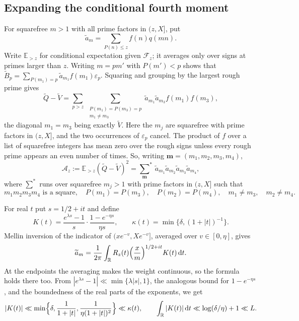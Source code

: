 \documentclass[11pt]{amsart}
\theoremstyle{remark}
\numberwithin{equation}{section}
\newcommand{\E}{\mathbb{E}}
\newcommand{\R}{\mathbb{R}}
\newcommand{\dd}{\,\mathrm{d}}
\newcommand{\tQ}{\widetilde{Q}}
\newcommand{\tV}{\widetilde{V}}
\newcommand{\tB}{\widetilde{B}}
\newcommand{\ta}{\widetilde{a}}
\newcommand{\bm}{\mathbf{m}}
\begin{document}
\subsection{Expanding the conditional fourth moment}
For squarefree $m>1$ with all prime factors in $(z,X]$, put
\[
\ta_m=\sum_{P(n)\le z}f(n)q(mn).
\]
Write $\E_{>z}$ for conditional expectation given $\mathcal F_z$; it averages only over signs at primes larger than $z$. Writing $m=pm'$ with $P(m')<p$ shows that $\tB_p=\sum_{P(m_1)=p}\ta_{m_1}f(m_1)\varepsilon_p$. Squaring and grouping by the largest rough prime gives
\[
\tQ-\tV=\sum_{p>z}\ \sum_{\substack{P(m_1)=P(m_3)=p\\ m_1\ne m_3}}\ta_{m_1}\ta_{m_3}f(m_1)f(m_3),
\]
the diagonal $m_1=m_3$ being exactly $\tV$. Here the $m_j$ are squarefree with prime factors in $(z,X]$, and the two occurrences of $\varepsilon_p$ cancel. The product of $f$ over a list of squarefree integers has mean zero over the rough signs unless every rough prime appears an even number of times. So, writing $\bm=(m_1,m_2,m_3,m_4)$,
\begin{equation}\label{eq:Az}
\mathcal A_z:=\E_{>z}(\tQ-\tV)^2={\sum_{\bm}}^{*}\,\ta_{m_1}\ta_{m_2}\ta_{m_3}\ta_{m_4},
\end{equation}
where $\sum^*$ runs over squarefree $m_j>1$ with prime factors in $(z,X]$ such that
\begin{equation}\label{eq:star}
m_1m_2m_3m_4\text{ is a square},\quad P(m_1)=P(m_3),\quad P(m_2)=P(m_4),\quad m_1\ne m_3,\quad m_2\ne m_4 .
\end{equation}

For real $t$ put $s=1/2+it$ and define
\begin{equation}\label{eq:K}
K(t)=\frac{e^{\lambda s}-1}{s}\cdot\frac{1-e^{-\eta s}}{\eta s},\qquad\kappa(t)=\min\bigl\{\delta,(1+|t|)^{-1}\bigr\}.
\end{equation}
Mellin inversion of the indicator of $(xe^{-v},Xe^{-v}]$, averaged over $v\in[0,\eta]$, gives
\[
\ta_m=\frac1{2\pi}\int_\R R_z(t)\Bigl(\frac xm\Bigr)^{1/2+it}K(t)\dd t .
\]
At the endpoints the averaging makes the weight continuous, so the formula holds there too. From $|e^{\lambda s}-1|\ll\min\{\lambda|s|,1\}$, the analogous bound for $1-e^{-\eta s}$, and the boundedness of the real parts of the exponents, we get
\begin{equation}\label{eq:Kbound}
|K(t)|\ll\min\Bigl\{\delta,\frac1{1+|t|},\frac1{\eta(1+|t|)^2}\Bigr\}\ll\kappa(t),\qquad\int_\R|K(t)|\dd t\ll\log(\delta/\eta)+1\ll L .
\end{equation}
\end{document}

